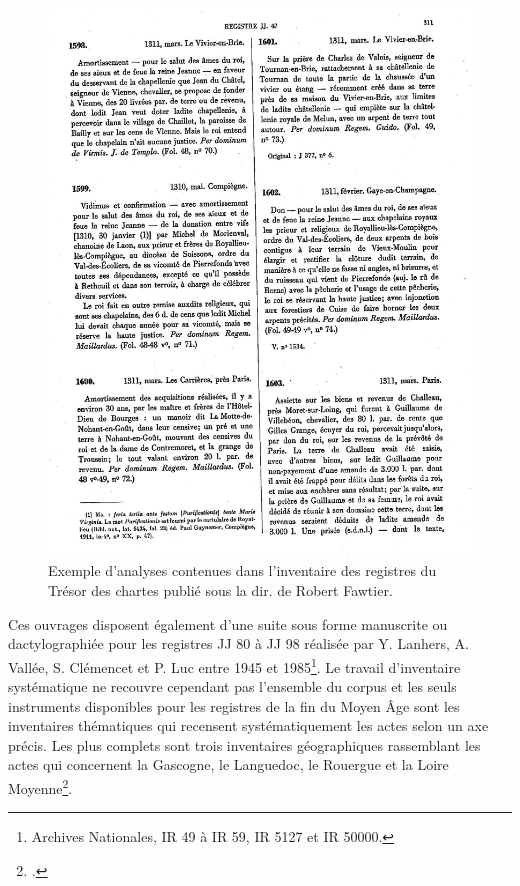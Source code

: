 \documentclass[a4paper,12pt,twoside]{book}
\begin{document}
	\begin{figure}
		\centering
		\includegraphics[width=\textwidth]{Images/Inventaire_papier.jpg}
		\caption{Exemple d'analyses contenues dans l'inventaire des registres du Trésor des chartes publié sous la dir. de Robert Fawtier.}
		\label{inventaire_papier}
	\end{figure}
	
	Ces ouvrages disposent également d'une suite sous forme manuscrite ou dactylographiée pour les registres JJ 80 à JJ 98 réalisée par Y. Lanhers, A. Vallée, S. Clémencet et P. Luc entre 1945 et 1985\footnote{Archives Nationales, IR 49 à IR 59, IR 5127 et IR 50000.}. Le travail d'inventaire systématique ne recouvre cependant pas l'ensemble du corpus et les seuls instruments disponibles pour les registres de la fin du Moyen Âge sont les inventaires thématiques qui recensent systématiquement les actes selon un axe précis. Les plus complets sont trois inventaires géographiques rassemblant les actes qui concernent la Gascogne, le Languedoc, le Rouergue et la Loire Moyenne\footcite{samaran_gascogne_1966, dossat_languedoc_1983, chevalier_les_1993}.
	
\end{document}
